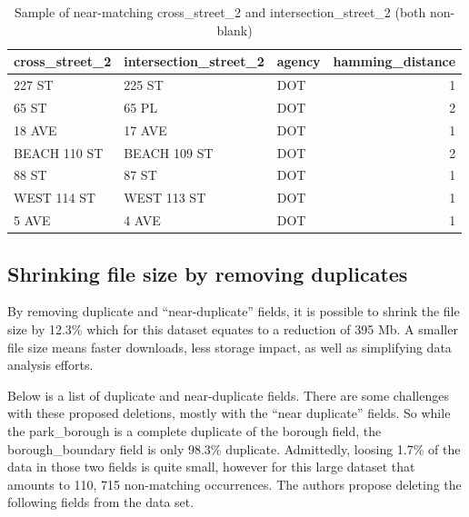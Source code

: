 \documentclass[12pt, titlepage]{article}
\begin{document}
\begin{table}[tbp]
	\centering
	\caption{Sample of near-matching cross\_street\_2 and 
     	intersection\_street\_2 (both non-blank)}
     	\label{tab:near_matching_cross_intersection_2}
	     	\begin{tabular}{l l l r}
	      \toprule
	      \textbf{cross\_street\_2} & \textbf{intersection\_street\_2} 
	      & \textbf{agency} & \textbf{hamming\_distance} \\
	      \midrule
	        227 ST         & 225 ST                & DOT    & 1 \\
	        65 ST          & 65 PL                 & DOT    & 2 \\
	        18 AVE         & 17 AVE                & DOT    & 1 \\
	        BEACH 110 ST   & BEACH 109 ST          & DOT    & 2 \\
	        88 ST          & 87 ST                 & DOT    & 1 \\
	        WEST 114 ST    & WEST 113 ST           & DOT    & 1 \\
	        5 AVE          & 4 AVE                 & DOT    & 1 \\
	      \bottomrule
	    	\end{tabular}
\end{table}


 \subsection{Shrinking file size by removing duplicates}
 \label{sec:filesize}
By removing duplicate and ``near-duplicate'' fields, it is possible to 
shrink the file size by 12.3\% which for this dataset equates to a 
reduction of 395 Mb. A smaller file size means faster downloads, 
less storage impact, as well as simplifying data analysis efforts.  
 
Below is a list of duplicate and near-duplicate fields. There are 
some challenges with these proposed deletions, mostly with 
the ``near duplicate'' fields.  So while the park\_borough is 
a complete duplicate of the borough field, the 
borough\_boundary field is only 98.3\% duplicate. Admittedly, 
loosing 1.7\% of the data in those two fields is quite small, however
for this large dataset that amounts to 110, 715 
non-matching occurrences. The authors  propose 
deleting the following fields from the data set.
 
\end{document}
